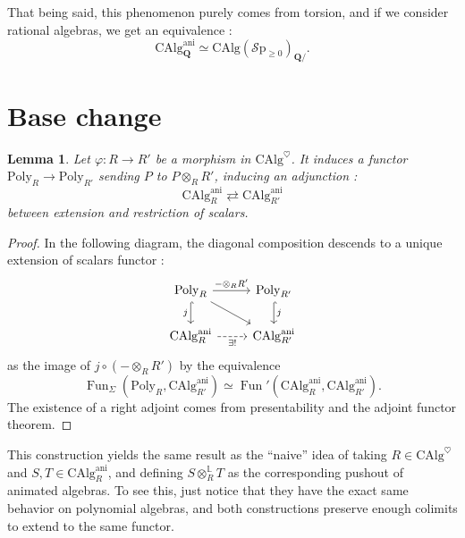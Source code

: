\documentclass[11pt]{article}
\newtheorem{lemma}[theorem]{Lemma}
\theoremstyle{definition}
\newcommand{\ani}{\mathrm{ani}}
\newcommand{\CAlg}{\mathrm{CAlg}}
\newcommand{\Fun}{\operatorname{Fun}}
\newcommand{\heart}{\heartsuit}
\renewcommand{\L}{\mathbb{L}}
\newcommand{\Poly}{\mathrm{Poly}}
\newcommand{\Q}{\mathbf{Q}}
\newcommand{\Sp}{\mathcal{S}\mathrm{p}}
\begin{document}
That being said, this phenomenon purely comes from torsion, and if we consider rational algebras, we get an equivalence :
\[
    \CAlg_{\Q}^{\ani} \simeq \CAlg(\Sp_{\geqslant 0})_{\Q/}.
\]

\section{Base change}

\begin{lemma}
    Let $\varphi : R \to R'$ be a morphism in $\CAlg^{\heart}$.
    It induces a functor $\Poly_R \to \Poly_{R'}$ sending $P$ to $P \otimes_R R'$, inducing an adjunction :
    \[
        \CAlg_R^{\ani} \rightleftarrows \CAlg_{R'}^{\ani}
    \]
    between extension and restriction of scalars.
\end{lemma}
\begin{proof}
    In the following diagram, the diagonal composition descends to a unique extension of scalars functor :
    \[\begin{tikzcd}
        {\Poly_R} & {\Poly_{R'}} \\
        {\CAlg_R^{\ani}} & {\CAlg_{R'}^{\ani}}
        \arrow["{- \otimes_R R'}", from=1-1, to=1-2]
        \arrow["j"', hook, from=1-1, to=2-1]
        \arrow[from=1-1, to=2-2]
        \arrow["j", hook, from=1-2, to=2-2]
        \arrow["{\exists!}"', dashed, from=2-1, to=2-2]
    \end{tikzcd}\]
    as the image of $j \circ (- \otimes_R R')$ by the equivalence
    \[
        \Fun_{\Sigma}(\Poly_R, \CAlg_{R'}^{\ani}) \simeq \Fun'(\CAlg_R^{\ani}, \CAlg_{R'}^{\ani}).
    \]
    The existence of a right adjoint comes from presentability and the adjoint functor theorem.
\end{proof}

This construction yields the same result as the \enquote{naive} idea of taking $R \in \CAlg^{\heart}$ and $S, T \in \CAlg_R^{\ani}$, and defining $S \otimes_R^{\L} T$ as the corresponding pushout of animated algebras.
To see this, just notice that they have the exact same behavior on polynomial algebras, and both constructions preserve enough colimits to extend to the same functor.
\end{document}
